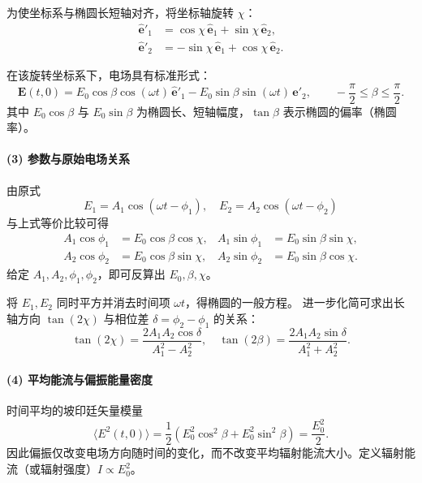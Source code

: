 为使坐标系与椭圆长短轴对齐，将坐标轴旋转 $\chi$：
\begin{equation}
\begin{aligned}
  \hat{\mathbf{e}}'_1 &= \cos\chi\,\hat{\mathbf{e}}_1 + \sin\chi\,\hat{\mathbf{e}}_2,\\
  \hat{\mathbf{e}}'_2 &= -\sin\chi\,\hat{\mathbf{e}}_1 + \cos\chi\,\hat{\mathbf{e}}_2.
\end{aligned}
\end{equation}

在该旋转坐标系下，电场具有标准形式：
\begin{equation}
  \mathbf{E}(t,0)
  = E_0\cos\beta\cos(\omega t)\,\hat{\mathbf{e}}'_1
  - E_0\sin\beta\sin(\omega t)\,\hat{\mathbf{e}}'_2,
  \qquad -\frac{\pi}{2}\le \beta\le \frac{\pi}{2}.
\end{equation}
其中 $E_0\cos\beta$ 与 $E_0\sin\beta$ 为椭圆长、短轴幅度，$\tan\beta$ 表示椭圆的偏率（椭圆率）。

\paragraph{(3) 参数与原始电场关系}
由原式
\[
E_1 = A_1\cos(\omega t-\phi_1), \quad E_2 = A_2\cos(\omega t-\phi_2)
\]
与上式等价比较可得
\begin{align*}
A_1\cos\phi_1 &= E_0\cos\beta\cos\chi, & A_1\sin\phi_1 &= E_0\sin\beta\sin\chi,\\
A_2\cos\phi_2 &= E_0\cos\beta\sin\chi, & A_2\sin\phi_2 &= E_0\sin\beta\cos\chi.
\end{align*}
给定 $A_1, A_2, \phi_1, \phi_2$，即可反算出 $E_0, \beta, \chi$。

\begin{derivationnote}[从两分量到椭圆参数的确定]
将 $E_1, E_2$ 同时平方并消去时间项 $\omega t$，得椭圆的一般方程。
进一步化简可求出长轴方向 $\tan(2\chi)$ 与相位差 $\delta=\phi_2-\phi_1$ 的关系：
\[
\tan(2\chi) = \frac{2A_1A_2\cos\delta}{A_1^2 - A_2^2},\quad
\tan(2\beta) = \frac{2A_1A_2\sin\delta}{A_1^2 + A_2^2}.
\]
\end{derivationnote}

\paragraph{(4) 平均能流与偏振能量密度}
时间平均的坡印廷矢量模量
\begin{equation}
\langle E^2(t,0)\rangle = \frac{1}{2}(E_0^2\cos^2\beta + E_0^2\sin^2\beta)
= \frac{E_0^2}{2}.
\end{equation}
因此偏振仅改变电场方向随时间的变化，而不改变平均辐射能流大小。定义辐射能流（或辐射强度）$I\propto E_0^2$。

